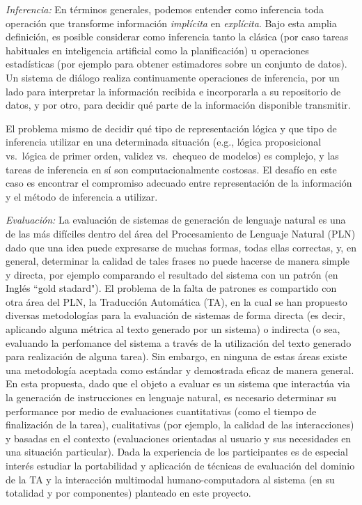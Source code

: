 \begin{myitemize}
  \item \emph{Inferencia:} En t\'erminos generales, podemos entender como
  inferencia toda operaci\'on que transforme informaci\'on \textit{impl\'icita} en
  \textit{expl\'icita}.  Bajo esta amplia definici\'on, es posible considerar como
  inferencia tanto la cl\'asica (por caso
  tareas habituales en inteligencia artificial como la planificaci\'on) u operaciones estad\'isticas (por ejemplo para obtener estimadores sobre un conjunto de datos).  Un sistema de di\'alogo realiza continuamente operaciones de inferencia, por un lado   para interpretar la informaci\'on recibida e incorporarla a su repositorio de datos, y por otro, para decidir qu\'e parte de la informaci\'on disponible transmitir.

  El problema mismo de decidir qu\'e tipo de representaci\'on l\'ogica y que tipo de inferencia utilizar en una determinada situaci\'on (e.g., l\'ogica proposicional vs.\ l\'ogica de primer orden, validez vs.\ chequeo de modelos) es complejo, y las tareas de inferencia en s\'i son computacionalmente costosas.  El desaf\'io en este caso es encontrar el compromiso adecuado entre representaci\'on de la informaci\'on y el m\'etodo de inferencia a utilizar.

\item \emph{Evaluaci\'on:} La evaluaci\'on de sistemas de generaci\'on de lenguaje natural es una de las m\'as dif\'iciles dentro del \'area del Procesamiento de Lenguaje Natural (PLN) dado que una idea puede expresarse de muchas formas, todas ellas correctas, y, en general, determinar la calidad de tales frases no puede hacerse de manera simple y directa, por ejemplo comparando el resultado del sistema con un patr\'on (en Ingl\'es ``gold stadard"). El problema de la falta de patrones es compartido con otra \'area del PLN, la Traducci\'on Autom\'atica (TA), en la cual se han propuesto diversas metodolog\'ias para la evaluaci\'on de sistemas de forma directa (es decir, aplicando alguna m\'etrica al texto generado por un sistema) o indirecta (o sea, evaluando la perfomance del sistema a trav\'es de la utilizaci\'on del texto generado para realizaci\'on de alguna tarea). Sin embargo, en ninguna de estas \'areas existe una metodolog\'ia aceptada como est\'andar y demostrada eficaz de manera general.
En esta propuesta, dado que el objeto a evaluar es un sistema que interact\'ua via la generaci\'on de instrucciones en lenguaje natural, es necesario determinar su performance por medio de evaluaciones cuantitativas (como el tiempo de finalizaci\'on de la tarea), cualitativas (por ejemplo, la calidad de las interacciones) y basadas en el contexto (evaluaciones orientadas al usuario y sus necesidades en una situaci\'on particular). Dada la experiencia de los participantes es de especial inter\'es estudiar la  portabilidad y aplicaci\'on de t\'ecnicas de evaluaci\'on del dominio de la TA y la interacci\'on multimodal humano-computadora al sistema (en su totalidad y por componentes) planteado en este proyecto.
\end{myitemize}

